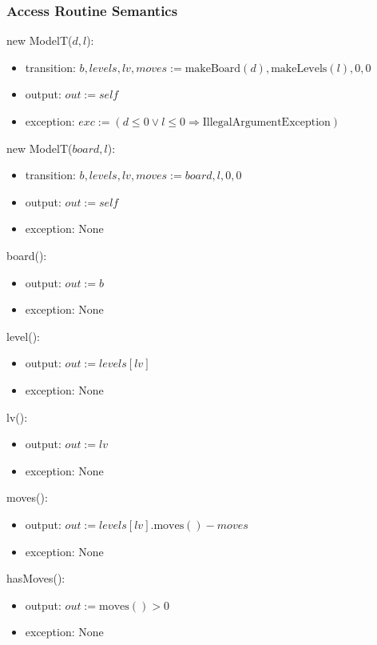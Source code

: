 \documentclass[12pt]{article}
\newcommand{\Implies}{\Rightarrow}
\begin{document}
\subsubsection* {Access Routine Semantics}

new ModelT($d, l$):
\begin{itemize}
	\item transition: $b, levels, lv, moves := \mbox{makeBoard}(d), \mbox{makeLevels}(l), 0, 0$
	\item output: $out := \mathit{self}$
	\item exception: $exc := (d \le 0 \lor l \le 0 \Implies \mbox{IllegalArgumentException})$
\end{itemize}

\noindent new ModelT($board, l$):
\begin{itemize}
	\item transition: $b, levels, lv, moves := board, l, 0, 0$
	\item output: $out := \mathit{self}$
	\item exception: None
\end{itemize}

\noindent board():
\begin{itemize}
	\item output: $out := b$
	\item exception: None
\end{itemize}

\noindent level():
\begin{itemize}
	\item output: $out := levels[lv]$
	\item exception: None
\end{itemize}

\noindent lv():
\begin{itemize}
	\item output: $out := lv$
	\item exception: None
\end{itemize}

\noindent moves():
\begin{itemize}
	\item output: $out := levels[lv].\mbox{moves}() - moves$
	\item exception: None
\end{itemize}

\noindent hasMoves():
\begin{itemize}
	\item output: $out := \mbox{moves}() > 0$
	\item exception: None
\end{itemize}
\end{document}

